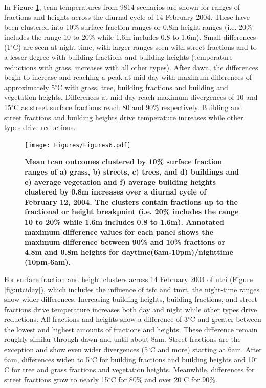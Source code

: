 \documentclass[final,3p,times,authoryear]{elsarticle}
\begin{document}
In Figure \ref{fig:tcanday}, \gls{tcan} temperatures from 9814 scenarios are shown for ranges of fractions and heights across the diurnal cycle of 14 February 2004. These have been clustered into 10\% surface fraction ranges or 0.8m height ranges (i.e. 20\% includes the range 10 to 20\%  while 1.6m includes 0.8 to 1.6m). Small differences (1$^{\circ}$C) are seen at night-time, with larger ranges seen with street fractions and to a lesser degree with building fractions and building heights (temperature reductions with grass, increases with all other types). After dawn, the differences begin to increase and reaching a peak at mid-day with maximum differences of approximately 5$^{\circ}$C with grass, tree, building fractions and building and vegetation heights. Differences at mid-day reach maximum divergences of 10 and 15$^{\circ}$C as street surface fractions reach 80 and 90\% respectively. Building and street fractions and building heights drive temperature increases while other types drive reductions.

\begin{figure}
\centering
\texttt{[image: Figures/Figures6.pdf]}
\caption{\bf Mean \gls{tcan} outcomes clustered by 10\% surface fraction ranges of a) grass, b) streets, c) trees, and d) buildings and e) average vegetation and f) average building heights clustered by 0.8m increases over a diurnal cycle of February 12, 2004. The clusters contain fractions up to the fractional or height breakpoint (i.e. 20\% includes the range 10 to 20\%  while 1.6m includes 0.8 to 1.6m). Annotated maximum difference values for each panel shows the maximum difference between 90\% and 10\% fractions or 4.8m and 0.8m heights for daytime(6am-10pm)/nighttime (10pm-6am). }
 \label{fig:tcanday}
\end{figure}

For surface fraction and height clusters across 14 February 2004 of \gls{utci} (Figure \ref{fig:utciday}), which includes the influence of \gls{tsfc} and \gls{tmrt}, the night-time ranges show wider differences. Increasing building heights, building fractions, and street fractions drive temperature increases both day and night while other types drive reductions. All fractions and heights show a difference of 3$^{\circ}$C and greater between the lowest and highest amounts of fractions and heights. These difference remain roughly similar through dawn and until about 8am. Street fractions are the exception and show even wider divergences (5$^{\circ}$C and more) starting at 6am. After 6am, differences widen to 5$^{\circ}$C for building fractions and building heights and 10$^{\circ}$C for tree and grass fractions and vegetation heights. Meanwhile, differences for street fractions grow to nearly 15$^{\circ}$C for 80\% and over 20$^{\circ}$C for 90\%.
\end{document}
